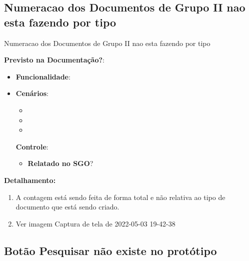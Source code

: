 \subsection{Numeracao dos Documentos de Grupo II nao esta fazendo por tipo}
\begin{falha}[1]{Numeracao dos Documentos de Grupo II nao esta fazendo por tipo}
	
	
	\textbf{Previsto na Documentação?}: \mschecksim
	\begin{itemize}
	\item \textbf{Funcionalidade}: 
	\item \textbf{Cenários}:
	\begin{itemize}
		\item \sosFuCuz 
		\item \sosFuCuu 
		\item \sosFuCud
	\end{itemize}
	
	\textbf{Controle}:
	\begin{itemize}
		\item \textbf{Relatado no SGO}? \mschecksim 
	\end{itemize}
	
		
		
	\end{itemize}
	
	\tcblower
	
	\textbf{Detalhamento:}
	\begin{enumerate}
		\item A contagem está sendo feita de forma total e não relativa ao tipo de documento que está sendo criado.
		\item Ver imagem Captura de tela de 2022-05-03 19-42-38
	\end{enumerate}
	
\end{falha}

\subsection{Botão Pesquisar não existe no protótipo}


